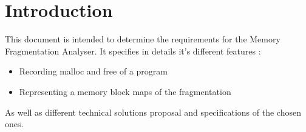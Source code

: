 \chapter{Introduction}
This document is intended to determine the requirements for the Memory Fragmentation Analyser. It specifies in details it's different features :
\begin{itemize}
    \item Recording malloc and free of a program
    \item Representing a memory block maps of the fragmentation
\end{itemize}

As well as different technical solutions proposal and specifications of the chosen ones. 

